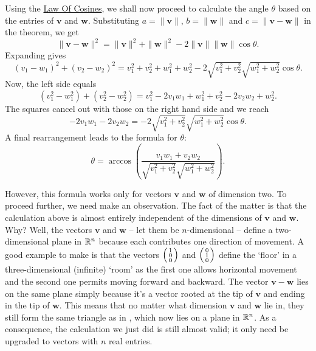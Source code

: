 Using the \hyperref[thm:law-of-cosines]{Law Of Cosines}, we shall now proceed to
calculate the angle $\theta$ based on the entries of $\mathbf{v}$ and
$\mathbf{w}$. Substituting $a = \|\mathbf{v}\|$, $b = \|\mathbf{w}\|$ and $c =
\|\mathbf{v} - \mathbf{w}\|$ in the theorem, we get
\[
 \|\mathbf{v}-\mathbf{w}\|^2 = \|\mathbf{v}\|^2 + \|\mathbf{w}\|^2 - 2
 \|\mathbf{v}\|\|\mathbf{w}\|\cos\theta.
\]
Expanding gives
\[
 (v_1 - w_1)^2 + (v_2 - w_2)^2 = v_1^2 + v_2^2 + w_1^2 + w_2^2 - 2 \sqrt{v_1^2 +
 v_2^2}\sqrt{w_1^2 + w_2^2}\cos\theta.
\]
Now, the left side equals
\[
 (v_1^2 - w_1^2) + (v_2^2 - w_2^2) = v_1^2 - 2v_1w_1 + w_1^2 + v_2^2 - 2v_2w_2 +
 w_2^2.
\]
The squares cancel out with those on the right hand side and we reach
\[
 -2v_1w_1 - 2v_2w_2 = -2 \sqrt{v_1^2 + v_2^2}\sqrt{w_1^2 + w_2^2} \cos \theta.
\]
A final rearrangement leads to the formula for $\theta$:
\[
 \theta = \arccos \left( \frac{v_1w_1 + v_2w_2}{\sqrt{v_1^2 + v_2^2}\sqrt{w_1^2
 + w_2^2}} \right).
\]

However, this formula works only for vectors $\mathbf{v}$ and $\mathbf{w}$ of
dimension two. To proceed further, we need make an observation. The fact of the
matter is that the calculation above is almost entirely independent of the
dimensions of $\mathbf{v}$ and $\mathbf{w}$. Why? Well, the vectors $\mathbf{v}$
and $\mathbf{w}$ -- let them be $n$-dimensional -- define a two-dimensional
plane in $\mathbb{R}^{n}$ because each contributes one direction of movement. A good
example to make is that the vectors $\begin{psmallmatrix} 1\\ 0 \\0
\end{psmallmatrix}$ and $\begin{psmallmatrix} 0 \\1 \\0 \end{psmallmatrix}$
define the `floor' in a three-dimensional (infinite) `room' as the first one
allows horizontal movement and the second one permits moving forward and
backward. The vector $\mathbf{v} - \mathbf{w}$ lies on the same plane simply
because it's a vector rooted at the tip of $\mathbf{v}$ and ending in the tip
of $\mathbf{w}$. This means that no matter what dimension $\mathbf{v}$ and
$\mathbf{w}$ lie in, they still form the same triangle as in
, which now lies on a plane in $\mathbb{R}^{n}$. As
a consequence, the calculation we just did is still almost valid; it only need
be upgraded to vectors with $n$ real entries.

